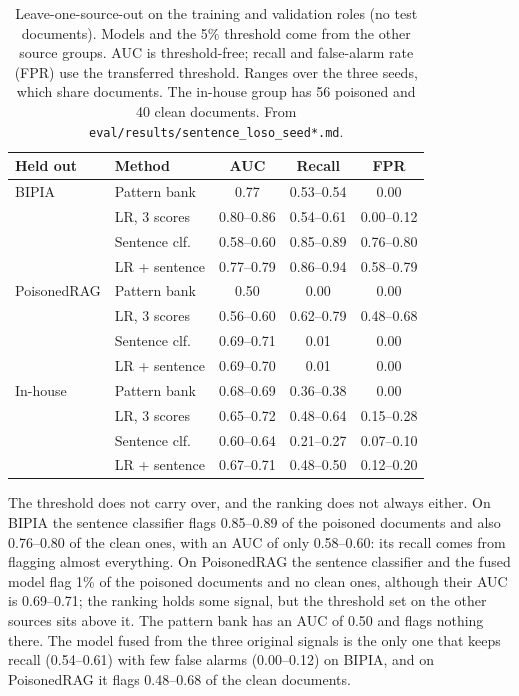 \begin{table}[t]
\caption{Leave-one-source-out on the training and validation roles (no test documents). Models and the 5\% threshold come from the other source groups. AUC is threshold-free; recall and false-alarm rate (FPR) use the transferred threshold. Ranges over the three seeds, which share documents. The in-house group has 56 poisoned and 40 clean documents. From \texttt{eval/results/sentence\_loso\_seed*.md}.}
\label{tab:loso}
\centering
\footnotesize
\setlength{\tabcolsep}{3.5pt}
\begin{tabular}{@{}llccc@{}}
\toprule
Held out & Method & AUC & Recall & FPR \\
\midrule
BIPIA & Pattern bank & 0.77 & 0.53--0.54 & 0.00 \\
 & LR, 3 scores & 0.80--0.86 & 0.54--0.61 & 0.00--0.12 \\
 & Sentence clf. & 0.58--0.60 & 0.85--0.89 & 0.76--0.80 \\
 & LR + sentence & 0.77--0.79 & 0.86--0.94 & 0.58--0.79 \\
\midrule
PoisonedRAG & Pattern bank & 0.50 & 0.00 & 0.00 \\
 & LR, 3 scores & 0.56--0.60 & 0.62--0.79 & 0.48--0.68 \\
 & Sentence clf. & 0.69--0.71 & 0.01 & 0.00 \\
 & LR + sentence & 0.69--0.70 & 0.01 & 0.00 \\
\midrule
In-house & Pattern bank & 0.68--0.69 & 0.36--0.38 & 0.00 \\
 & LR, 3 scores & 0.65--0.72 & 0.48--0.64 & 0.15--0.28 \\
 & Sentence clf. & 0.60--0.64 & 0.21--0.27 & 0.07--0.10 \\
 & LR + sentence & 0.67--0.71 & 0.48--0.50 & 0.12--0.20 \\
\bottomrule
\end{tabular}
\end{table}

The threshold does not carry over, and the ranking does not always either. On
BIPIA the sentence classifier flags 0.85--0.89 of the poisoned documents and also
0.76--0.80 of the clean ones, with an AUC of only 0.58--0.60: its recall comes
from flagging almost everything. On PoisonedRAG the sentence classifier and the
fused model flag 1\% of the poisoned documents and no clean ones, although their
AUC is 0.69--0.71; the ranking holds some signal, but the threshold set on the
other sources sits above it. The pattern bank has an AUC of 0.50 and flags
nothing there. The model fused from the three original signals is the only one
that keeps recall (0.54--0.61) with few false alarms (0.00--0.12) on BIPIA, and on
PoisonedRAG it flags 0.48--0.68 of the clean documents.


